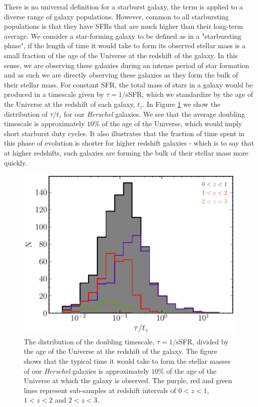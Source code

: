 There is no universal definition for a starburst galaxy, the term is applied to a diverse range of galaxy populations. However, common to all starbursting populations is that they have SFRs that are much higher than their long-term average. We consider a star-forming galaxy to be defined as in a "starbursting phase", if the length of time it would take to form its observed stellar mass is a small fraction of the age of the Universe at the redshift of the galaxy. In this sense, we are observing these galaxies during an intense period of star formation and as such we are directly observing these galaxies as they form the bulk of their stellar mass. For constant SFR, the total mass of stars in a galaxy would be produced in a timescale given by $\tau = 1/$sSFR, which we standardize by the age of the Universe at the redshift of each galaxy, $t_z$. In Figure \ref{fig:tau_against_age} we show the distribution of $\tau/t_z$ for our \textit{Herschel} galaxies. We see that the average doubling timescale is approximately $10\%$ of the age of the Universe, which would imply short starburst duty cycles. It also illustrates that the fraction of time spent in this phase of evolution is shorter for higher redshift galaxies - which is to say that at higher redshifts, such galaxies are forming the bulk of their stellar mass more quickly.

\begin{figure}
	\centering
	\includegraphics[width=0.8\columnwidth]{Figures/tau_against_age.pdf}
	\caption[Doubling timescale of \textit{Herschel} galaxies]{The distribution of the doubling timescale, $\tau = 1/$sSFR, divided by the age of the Universe at the redshift of the galaxy. The figure shows that the typical time it would take to form the stellar masses of our \textit{Herschel} galaxies is approximately $10\%$ of the age of the Universe at which the galaxy is observed. The purple, red and green lines represent sub-samples at redshift intervals of $0 < z < 1$, $1 < z < 2$ and $2 < z < 3$.}
	\label{fig:tau_against_age}
\end{figure}

